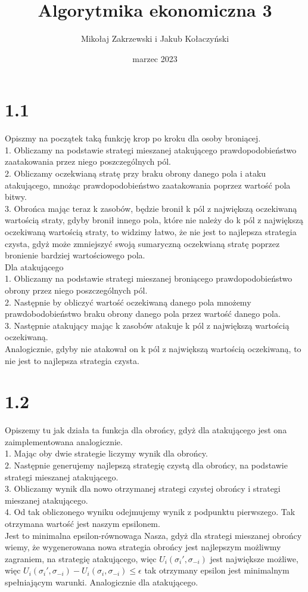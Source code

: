 \documentclass{article}
\title{Algorytmika ekonomiczna 3}
\author{Mikołaj Zakrzewski i Jakub Kołaczyński}
\date{marzec 2023}
\begin{document}
\maketitle
\section*{1.1}
    Opiszmy na początek taką funkcję krop po kroku dla osoby broniącej.\\
    1. Obliczamy na podstawie strategi mieszanej atakującego prawdopodobieństwo zaatakowania przez niego poszczególnych pól.\\
    2. Obliczamy oczekwianą stratę przy braku obrony danego pola i ataku atakującego, mnożąc prawdopodobieństwo zaatakowania poprzez wartość pola bitwy.\\
    3. Obrońca mając teraz k zasobów, będzie bronił k pól z największą oczekiwaną wartością straty, gdyby bronił innego pola, które nie należy do k pól z największą oczekiwaną wartością straty, to widzimy łatwo, że nie jest to najlepsza strategia czysta, gdyż może zmniejszyć swoją sumaryczną oczekwianą stratę poprzez bronienie bardziej wartościowego pola.
    \\
    Dla atakującego \\
    1. Obliczamy na podstawie strategi mieszanej broniącego prawdopodobieństwo obrony przez niego poszczególnych pól.\\
    2. Następnie by obliczyć wartość oczekiwaną danego pola mnożemy prawdobodobieństwo braku obrony danego pola przez wartość danego pola.\\
    3. Następnie atakujący mając k zasobów atakuje k pól z największą wartością oczekiwaną.\\
    Analogicznie, gdyby nie atakował on k pól z największą wartością oczekiwaną, to nie jest to najlepsza strategia czysta.
\section*{1.2}

Opiszemy tu jak działa ta funkcja dla obrońcy, gdyż dla atakującego jest ona zaimplementowana analogicznie.\\
    1. Mając oby dwie strategie liczymy wynik dla obrońcy.\\
    2. Następnie generujemy najlepszą strategię czystą dla obrońcy, na podstawie strategi mieszanej atakującego.\\
    3. Obliczamy wynik dla nowo otrzymanej strategi czystej obrońcy i strategi mieszanej atakującego.\\
    4. Od tak obliczonego wyniku odejmujemy wynik z podpunktu pierwszego. Tak otrzymana wartość jest naszym epsilonem.\\
    Jest to minimalna epsilon-równowaga Nasza, gdyż dla strategi mieszanej obrońcy wiemy, że wygenerowana nowa strategia obrońcy jest najlepszym możliwmy zagraniem, na strategię atakującego, więc $U_i(\sigma_i', \sigma_{-i})$ jest największe możliwe, więc 
    $U_i(\sigma_i', \sigma_{-i}) - U_i(\sigma_i, \sigma_{-i}) \leq \epsilon$ tak otrzymany epsilon jest minimalnym spełniającym warunki. Analogicznie dla atakującego.
\end{document}
